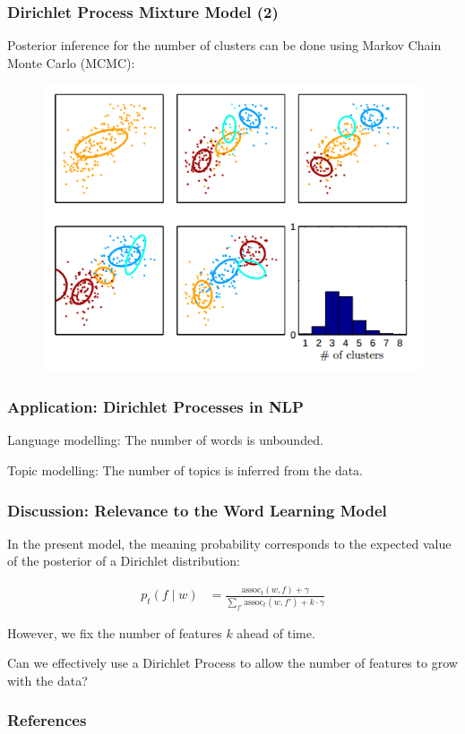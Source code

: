 \documentclass[12pt]{beamer}
\begin{document}
\begin{frame}
    \frametitle{Dirichlet Process Mixture Model (2)}

    Posterior inference for the number of clusters can be done using
    Markov Chain Monte Carlo (MCMC):

    \begin{figure}[!h]
        \includegraphics[width=.7\textwidth]{images/dpmm_clustering.png}
    \end{figure}

\end{frame}



\begin{frame}
    \frametitle{Application: Dirichlet Processes in NLP}

    \alert{Language modelling:} The number of words is unbounded.

    \bigskip
    \bigskip

    \alert{Topic modelling:} The number of topics is inferred from
    the data.

\end{frame}



\begin{frame}
    \frametitle{Discussion: Relevance to the Word Learning Model}

    In the present model, the meaning probability corresponds to the expected
    value of the posterior of a Dirichlet distribution:

    \begin{align*}
        p_t(f \mid w) &=
        \frac{
            \text{assoc}_t(w, f) + \gamma
        }
        {
            \sum_{f'}\text{assoc}_t(w, f') + k \cdot \gamma
        }
    \end{align*}

    However, we fix the number of features $k$ ahead of time.

    \bigskip

    \pause

    Can we effectively use a Dirichlet Process to allow the number of features
    to grow with the data?


\end{frame}


\begin{frame}[t]
    \frametitle{References}
    
\end{frame}
\end{document}

